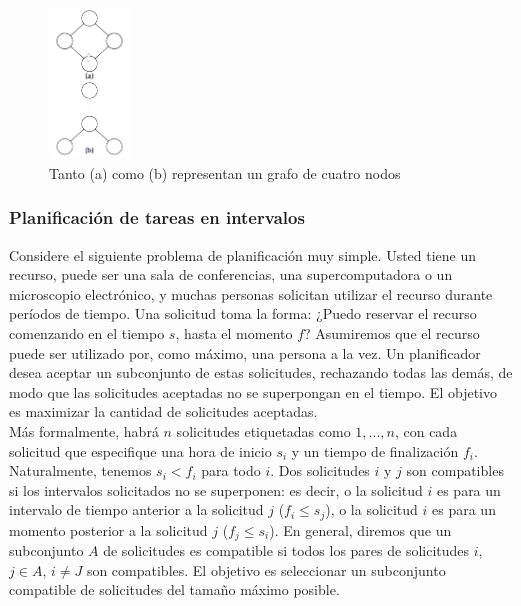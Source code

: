\documentclass[a4paper]{article}
\begin{document}
\begin{figure}
\centering
\includegraphics[width=0.19\textwidth]{Imagenes-Seccion1/fig1_3.png}
\caption{Tanto (a) como (b) representan un grafo de cuatro nodos}
\end{figure}

\subsubsection*{Planificación de tareas en intervalos}

Considere el siguiente problema de planificación muy simple. Usted tiene un recurso, puede ser una sala de conferencias, una supercomputadora o un microscopio electrónico, y muchas personas solicitan utilizar el recurso durante períodos de tiempo. Una solicitud toma la forma: ¿Puedo reservar el recurso comenzando en el tiempo $s$, hasta el momento $f$? Asumiremos que el recurso puede ser utilizado por, como máximo, una persona a la vez. Un planificador desea aceptar un subconjunto de estas solicitudes, rechazando todas las demás, de modo que las solicitudes aceptadas no se superpongan en el tiempo. El objetivo es maximizar la cantidad de solicitudes aceptadas.\\

Más formalmente, habrá $n$ solicitudes etiquetadas como $1, ..., n$, con cada solicitud que especifique una hora de inicio $s_i$ y un tiempo de finalización $f_i$. Naturalmente, tenemos $s_i<f_i$ para todo $i$. Dos solicitudes $i$ y $j$ son compatibles si los intervalos solicitados no se superponen: es decir, o la solicitud $i$ es para un intervalo de tiempo anterior a la solicitud $j$ ($f_i≤s_j$), o la solicitud $i$ es para un momento posterior a la solicitud $j$ ($f_j≤s_i$). En general, diremos que un subconjunto $A$ de solicitudes es compatible si todos los pares de solicitudes $i$, $j  \in  A$, $i≠J$ son compatibles. El objetivo es seleccionar un subconjunto compatible de solicitudes del tamaño máximo posible.\\
\end{document}
